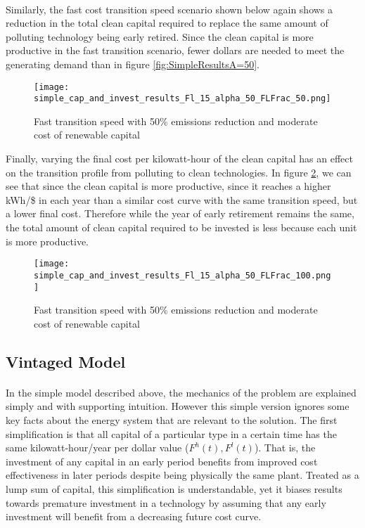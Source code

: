 \documentclass{article}
\begin{document}
\paragraph{} Similarly, the fast cost transition speed scenario shown below again shows a reduction in the total clean capital required to replace the same amount of polluting technology being early retired. Since the clean capital is more productive in the fast transition scenario, fewer dollars are needed to meet the generating demand than in figure \ref{fig:SimpleResultsA=50}. 


\begin{figure}[h]
\texttt{[image: simple\_cap\_and\_invest\_results\_Fl\_15\_alpha\_50\_FLFrac\_50.png]}
\caption{Fast transition speed with 50\% emissions reduction and moderate cost of renewable capital\label{fig:SimpleResultsFl=1}}
\end{figure}

\FloatBarrier

Finally, varying the final cost per kilowatt-hour of the clean capital has an effect on the transition profile from polluting to clean technologies. In figure \ref{fig:SimpleResultsFl=1}, we can see that since the clean capital is more productive, since it reaches a higher kWh/\$ in each year than a similar cost curve with the same transition speed, but a lower final cost. Therefore while the year of early retirement remains the same, the total amount of clean capital required to be invested is less because each unit is more productive. 

\begin{figure}[h]
\texttt{[image: simple\_cap\_and\_invest\_results\_Fl\_15\_alpha\_50\_FLFrac\_100.png]}
\caption{Fast transition speed with 50\% emissions reduction and moderate cost of renewable capital\label{fig:SimpleResultsFl=1}}
\end{figure}


\FloatBarrier

\subsection{Vintaged Model}\label{VintExplan}

\paragraph{} In the simple model described above, the mechanics of the problem are explained simply and with supporting intuition. However this simple version ignores some key facts about the energy system that are relevant to the solution. The first simplification is that all capital of a particular type in a certain time has the same kilowatt-hour/year per dollar value ($F^h(t), F^l(t)$). That is, the investment of any capital in an early period benefits from improved cost effectiveness in later periods despite being physically the same plant. Treated as a lump sum of capital, this simplification is understandable, yet it biases results towards premature investment in a technology by assuming that any early investment will benefit from a decreasing future cost curve. 
\end{document}
